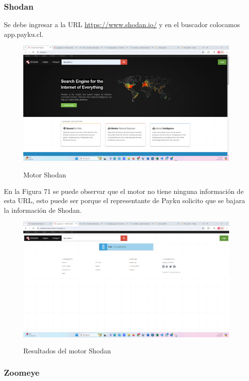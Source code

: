 \documentclass[stu, 11pt, letterpaper, donotrepeattitle, floatsintext, natbib]{apa7}
\begin{document}
\subsubsection{Shodan}

Se debe ingresar a la URL \url{https://www.shodan.io/} y en el buscador colocamos app.payku.cl.

\begin{figure}[H]
    \centering
    \caption{Motor Shodan}
    \includegraphics[width=0.75\linewidth]{ac61.png} %
    \label{fig:OverallEffect}
\end{figure}

En la Figura 71 se puede observar que el motor no tiene ninguna información de esta URL, esto puede ser porque el representante de Payku solicito que se bajara la información de Shodan.

\begin{figure}[H]
    \centering
    \caption{Resultados del motor Shodan}
    \includegraphics[width=0.75\linewidth]{ac62.png} %
    \label{fig:OverallEffect}
\end{figure}

\subsubsection{Zoomeye}
\end{document}
